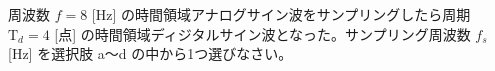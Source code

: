 周波数 $f = 8$ [Hz] の時間領域アナログサイン波をサンプリングしたら周期 $\textrm{T}_d = 4$ [点] の時間領域ディジタルサイン波となった。サンプリング周波数 $f_s$ [Hz] を選択肢 a〜d の中から1つ選びなさい。
